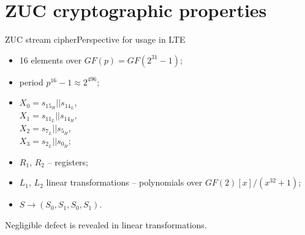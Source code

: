 \documentclass[10pt, ucs]{beamer}
\begin{document}
\section{ZUC cryptographic properties}
\begin{frame}{ZUC stream cipher}{Perspective for usage in LTE}
    \begin{minipage}{0.4 \textwidth}
        \begin{itemize}
            \item 16 elements over {\small $GF(p) = GF(2^{31}-1)$};
            \item period $p^{16} -1 \approx 2^{496}$;
            \item $X_0 = s_{15_H} || s_{14_L}$,  \\ 
                $X_1 = s_{11_L} || s_{14_H}$,  \\ 
                $X_2 = s_{7_L} || s_{5_H}$,  \\ 
                $X_3 = s_{2_L} || s_{0_H}$;
            \item $R_1$, $R_2$ -- registers;
            \item $L_1$, $L_2$
                linear transformations --
                polynomials over $GF(2)[x]/(x^{32}+1)$;
            \item $S \rightarrow (S_0, S_1, S_0, S_1)$.
        \end{itemize}
        \begin{block}{}
            Negligible defect is revealed in linear transformations.
        \end{block}
    \end{minipage}%
        \hspace*{1.6ex}%
    \begin{minipage}{0.6 \textwidth}
        
    \end{minipage}
\end{frame}
\end{document}
